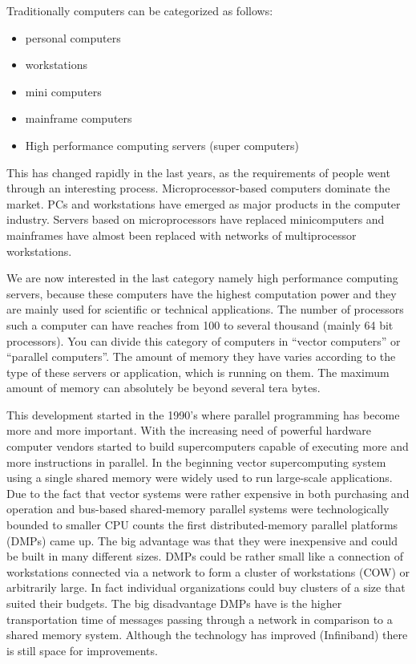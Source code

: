 Traditionally computers can be categorized as follows:
\begin{itemize}
\item personal computers
\item workstations
\item mini computers
\item mainframe computers
\item High performance computing servers (super computers)
\end{itemize}

This has changed rapidly in the last years, as the requirements of
people went through an interesting process. Microprocessor-based
computers dominate the market. PCs and workstations have emerged as
major products in the computer industry. Servers based on
microprocessors have replaced minicomputers and mainframes have almost
been replaced with networks of multiprocessor workstations.

We are now interested in the last category namely high performance
computing servers, because these computers have the highest
computation power and they are mainly used
for scientific or technical applications. The number of processors
such a computer can have reaches from 100 to several thousand (mainly
64 bit processors).
You can divide this category of computers in ``vector computers'' or ``parallel
computers''. The amount of memory they have varies according to the type of
these servers or application, which is running on them. The maximum
amount of memory can absolutely be beyond several tera bytes.  

This development started in the 1990's where parallel programming has
become more and more important. With the increasing need of powerful
hardware computer vendors started to build supercomputers capable of
executing more and more instructions in parallel. In the beginning
vector supercomputing system using a single shared memory were widely
used to run large-scale applications. Due to the fact that vector
systems were rather expensive in both purchasing and operation and
bus-based shared-memory parallel systems were technologically bounded
to smaller CPU counts the first distributed-memory parallel platforms (DMPs)
came up. The big advantage was that they were inexpensive and could be
built in many different sizes. DMPs could be rather small like a
connection of workstations connected via a network to form a cluster of
workstations (COW) or arbitrarily large. In fact individual
organizations could buy clusters of a size that suited their
budgets. The big disadvantage DMPs have is the higher transportation
time of messages passing through a network in comparison to a shared
memory system. Although the technology has improved (Infiniband) there
is still space for improvements. 


